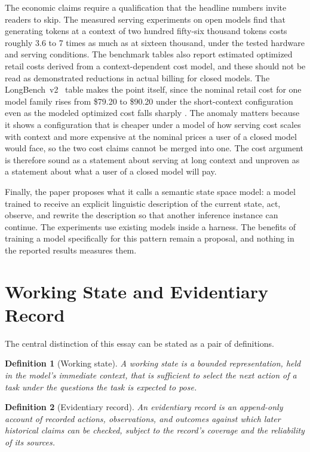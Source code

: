 \documentclass[11pt]{article}
\newtheorem{definition}{Definition}
\begin{document}
The economic claims require a qualification that the headline numbers invite readers to skip. The measured serving experiments on open models find that generating tokens at a context of two hundred fifty-six thousand tokens costs roughly 3.6 to 7 times as much as at sixteen thousand, under the tested hardware and serving conditions. The benchmark tables also report estimated optimized retail costs derived from a context-dependent cost model, and these should not be read as demonstrated reductions in actual billing for closed models. The LongBench~v2~\cite{longbench} table makes the point itself, since the nominal retail cost for one model family rises from \$79.20 to \$90.20 under the short-context configuration even as the modeled optimized cost falls sharply \cite{paper}. The anomaly matters because it shows a configuration that is cheaper under a model of how serving cost scales with context and more expensive at the nominal prices a user of a closed model would face, so the two cost claims cannot be merged into one. The cost argument is therefore sound as a statement about serving at long context and unproven as a statement about what a user of a closed model will pay.

Finally, the paper proposes what it calls a semantic state space model: a model trained to receive an explicit linguistic description of the current state, act, observe, and rewrite the description so that another inference instance can continue. The experiments use existing models inside a harness. The benefits of training a model specifically for this pattern remain a proposal, and nothing in the reported results measures them.

\section{Working State and Evidentiary Record}\label{sec:record}

The central distinction of this essay can be stated as a pair of definitions.

\begin{definition}[Working state]
A working state is a bounded representation, held in the model's immediate context, that is sufficient to select the next action of a task under the questions the task is expected to pose.
\end{definition}

\begin{definition}[Evidentiary record]
An evidentiary record is an append-only account of recorded actions, observations, and outcomes against which later historical claims can be checked, subject to the record's coverage and the reliability of its sources.
\end{definition}
\end{document}
